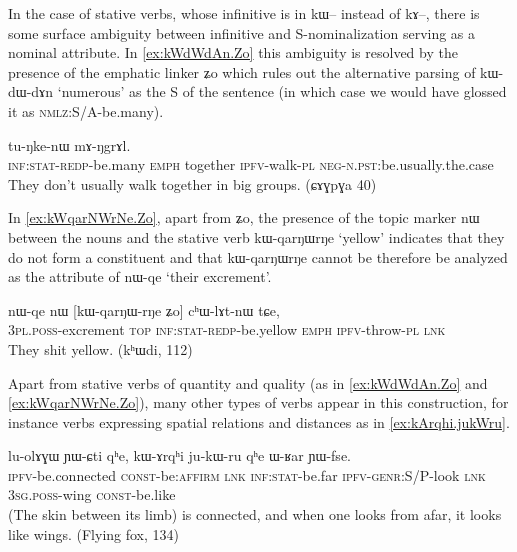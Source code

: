 \documentclass[oldfontcommands,oneside,a4paper,11pt]{article}
\newcommand{\ipa}[1]{{\phon \mbox{#1}}} %
\begin{document}
  In the case of stative verbs, whose infinitive is in \ipa{kɯ--} instead of \ipa{kɤ--}, there is some surface ambiguity between infinitive and S-nominalization serving as a nominal attribute. In \ref{ex:kWdWdAn.Zo}  this ambiguity is resolved by the presence of the emphatic linker \ipa{ʑo} which rules out the alternative parsing of \ipa{kɯ-dɯ-dɤn} `numerous' as the S of the sentence (in which case we would have glossed it as \textsc{nmlz}:S/A-be.many).
  
\begin{exe}
\ex \label{ex:kWdWdAn.Zo}
\gll
[\ipa{kɯ-dɯ-dɤn} 	\ipa{ʑo}] 	\ipa{tɯtɯrca} 	\ipa{tu-ŋke-nɯ} 	\ipa{mɤ-ŋgrɤl.} \\
\textsc{inf:stat-redp}-be.many \textsc{emph} together \textsc{ipfv}-walk-\textsc{pl} \textsc{neg-n.pst}:be.usually.the.case \\
\glt They don't usually walk together in big groups. (ɕɤɣpɣa 40)
\end{exe}

In \ref{ex:kWqarNWrNe.Zo}, apart from \ipa{ʑo}, the presence of the topic marker \ipa{nɯ} between the nouns and the stative verb 	\ipa{kɯ-qarŋɯrŋe} `yellow' indicates that  they do not form a constituent and that 	\ipa{kɯ-qarŋɯrŋe} cannot be therefore be analyzed as the attribute of  \ipa{nɯ-qe} `their excrement'.

\begin{exe}
\ex \label{ex:kWqarNWrNe.Zo}
\gll
\ipa{nɯ-qe} 	\ipa{nɯ} 	[\ipa{kɯ-qarŋɯ-rŋe} 	\ipa{ʑo}] 	\ipa{cʰɯ-lɤt-nɯ} 	\ipa{tɕe,} \\
\textsc{3pl.poss}-excrement \textsc{top} \textsc{inf:stat-redp}-be.yellow \textsc{emph}  \textsc{ipfv}-throw-\textsc{pl} \textsc{lnk} \\
\glt They shit yellow. (kʰɯdi, 112)
\end{exe}


Apart from stative  verbs of quantity and quality   (as in \ref{ex:kWdWdAn.Zo} and \ref{ex:kWqarNWrNe.Zo}), many other types of verbs appear in this construction, for instance verbs expressing spatial relations and distances as in \ref{ex:kArqhi.jukWru}.

\begin{exe}
\ex \label{ex:kArqhi.jukWru}
\gll
\ipa{lu-olɤɣɯ} 	\ipa{ɲɯ-ɕti} 	\ipa{qʰe,} 	\ipa{kɯ-ɤrqʰi} 	\ipa{ju-kɯ-ru} 	\ipa{qʰe} 	\ipa{ɯ-ʁar} 	\ipa{ɲɯ-fse.}\\
\textsc{ipfv}-be.connected \textsc{const}-be:\textsc{affirm} \textsc{lnk} \textsc{inf:stat}-be.far \textsc{ipfv-genr}:S/P-look \textsc{lnk} \textsc{3sg.poss}-wing \textsc{const}-be.like\\
\glt (The skin between its limb) is connected, and when one looks from afar, it looks like wings. (Flying fox, 134)
\end{exe}
\end{document}
